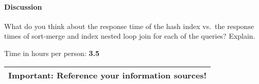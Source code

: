 \documentclass[11pt]{scrartcl}
\begin{document}
\paragraph{Discussion}

What do you think about the response time of the hash index vs.\ the
response times of sort-merge and index nested loop join for each of
the queries? Explain.

\bigskip

\noindent Time in hours per person: {\bf 3.5}

\bigskip

\begin{center}
  \begin{tabular}{c}
    \hline
    {\bf Important:} Reference your information sources!
    \\\hline
  \end{tabular}
\end{center}
\end{document}
